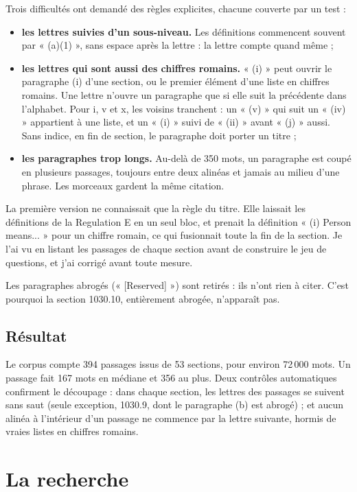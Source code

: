 \documentclass[11pt,a4paper]{article}
\begin{document}
Trois difficultés ont demandé des règles explicites, chacune couverte par un test :
\begin{itemize}
  \item \textbf{les lettres suivies d'un sous-niveau.} Les définitions commencent souvent par « (a)(1) », sans espace après la lettre : la lettre compte quand même ;
  \item \textbf{les lettres qui sont aussi des chiffres romains.} « (i) » peut ouvrir le paragraphe (i) d'une section, ou le premier élément d'une liste en chiffres romains. Une lettre n'ouvre un paragraphe que si elle suit la précédente dans l'alphabet. Pour i, v et x, les voisins tranchent : un « (v) » qui suit un « (iv) » appartient à une liste, et un « (i) » suivi de « (ii) » avant « (j) » aussi. Sans indice, en fin de section, le paragraphe doit porter un titre ;
  \item \textbf{les paragraphes trop longs.} Au-delà de 350 mots, un paragraphe est coupé en plusieurs passages, toujours entre deux alinéas et jamais au milieu d'une phrase. Les morceaux gardent la même citation.
\end{itemize}

La première version ne connaissait que la règle du titre. Elle laissait les définitions de la Regulation E en un seul bloc, et prenait la définition « (i) Person means... » pour un chiffre romain, ce qui fusionnait toute la fin de la section. Je l'ai vu en listant les passages de chaque section avant de construire le jeu de questions, et j'ai corrigé avant toute mesure.

Les paragraphes abrogés (« [Reserved] ») sont retirés : ils n'ont rien à citer. C'est pourquoi la section 1030.10, entièrement abrogée, n'apparaît pas.

\subsection{Résultat}

Le corpus compte 394 passages issus de 53 sections, pour environ 72\,000 mots. Un passage fait 167 mots en médiane et 356 au plus. Deux contrôles automatiques confirment le découpage : dans chaque section, les lettres des passages se suivent sans saut (seule exception, 1030.9, dont le paragraphe (b) est abrogé) ; et aucun alinéa à l'intérieur d'un passage ne commence par la lettre suivante, hormis de vraies listes en chiffres romains.

\section{La recherche}
\end{document}
